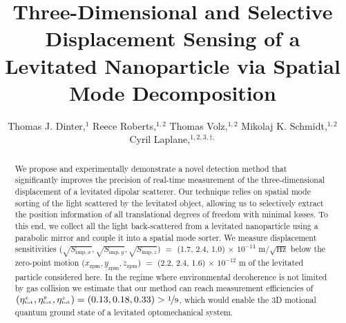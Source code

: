 \documentclass[%
 reprint,
 amsmath,amssymb,
 aps,
pra,
]{revtex4-2}
\begin{document}

\title{Three-Dimensional and Selective Displacement Sensing of a Levitated Nanoparticle via Spatial Mode Decomposition}

\author{Thomas J. Dinter,$^{1}$ Reece Roberts,$^{1, 2}$ Thomas Volz,$^{1, 2}$ Mikolaj K. Schmidt,$^{1, 2}$ Cyril Laplane,$^{1, 2, 3, \dag, }$}




\begin{abstract}
We propose and experimentally demonstrate a novel detection method that significantly improves the precision of real-time measurement of the three-dimensional displacement of a levitated dipolar scatterer. Our technique relies on spatial mode sorting of the light scattered by the levitated object, allowing us to selectively extract the position information of all translational degrees of freedom with minimal losses. To this end, we collect all the light back-scattered from a levitated nanoparticle using a parabolic mirror and couple it into a spatial mode sorter. We measure displacement sensitivities ($\sqrt{S_{\mathrm{imp}, x}}, \sqrt{S_{\mathrm{imp}, y}}, \sqrt{S_{\mathrm{imp}, z}}$) $=$ (1.7, 2.4, 1.0) $\times$ $10^{-14}$ m/$\sqrt{\mathrm{Hz}}$ below the zero-point motion ($x_{\mathrm{zpm}}, y_{\mathrm{zpm}}, z_{\mathrm{zpm}}$) $=$ (2.2, 2.4, 1.6) $\times$ $10^{-12}$ m of the levitated particle considered here. In the regime where environmental decoherence is not limited by gas collision we estimate that our method can reach measurement efficiencies of $(\eta_{^{\mathrm{tot}}}^{_{x}}, \eta_{^{\mathrm{tot}}}^{_{y}}, \eta_{^{\mathrm{tot}}}^{_{z}}) = (0.13, 0.18, 0.33) > \nicefrac{1}{9}$, which would enable the 3D motional quantum ground state of a levitated optomechanical system.
\end{abstract}

\maketitle
\end{document}
